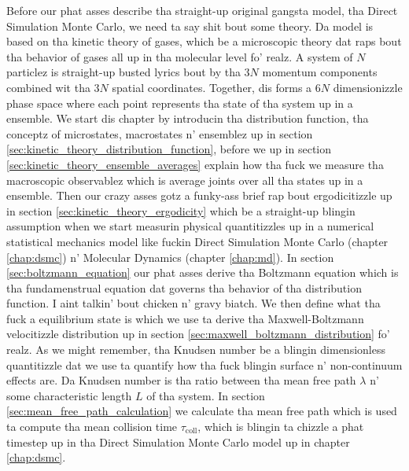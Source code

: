 Before our phat asses describe tha straight-up original gangsta model, tha Direct Simulation Monte Carlo, we need ta say shit bout some theory. Da model is based on tha kinetic theory of gases, which be a microscopic theory dat raps bout tha behavior of gases all up in tha molecular level fo' realz. A system of $N$ particlez is straight-up busted lyrics bout by tha $3N$ momentum components combined wit tha $3N$ spatial coordinates. Together, dis forms a $6N$ dimensionizzle phase space where each point represents tha state of tha system up in a ensemble. We start dis chapter by introducin tha distribution function, tha conceptz of microstates, macrostates n' ensemblez up in section \ref{sec:kinetic_theory_distribution_function}, before we up in section \ref{sec:kinetic_theory_ensemble_averages} explain how tha fuck we measure tha macroscopic observablez which is average joints over all tha states up in a ensemble. Then our crazy asses gotz a funky-ass brief rap bout ergodicitizzle up in section \ref{sec:kinetic_theory_ergodicity} which be a straight-up blingin assumption when we start measurin physical quantitizzles up in a numerical statistical mechanics model like fuckin Direct Simulation Monte Carlo (chapter \ref{chap:dsmc}) n' Molecular Dynamics (chapter \ref{chap:md}). In section \ref{sec:boltzmann_equation} our phat asses derive tha Boltzmann equation which is tha fundamenstrual equation dat governs tha behavior of tha distribution function. I aint talkin' bout chicken n' gravy biatch. We then define what tha fuck a equilibrium state is which we use ta derive tha Maxwell-Boltzmann velocitizzle distribution up in section \ref{sec:maxwell_boltzmann_distribution} fo' realz. As we might remember, tha Knudsen number be a blingin dimensionless quantitizzle dat we use ta quantify how tha fuck blingin surface n' non-continuum effects are. Da Knudsen number is tha ratio between tha mean free path $\lambda$ n' some characteristic length $L$ of tha system. In section \ref{sec:mean_free_path_calculation} we calculate tha mean free path which is used ta compute tha mean collision time $\tau_\text{coll}$, which is blingin ta chizzle a phat timestep up in tha Direct Simulation Monte Carlo model up in chapter \ref{chap:dsmc}.
